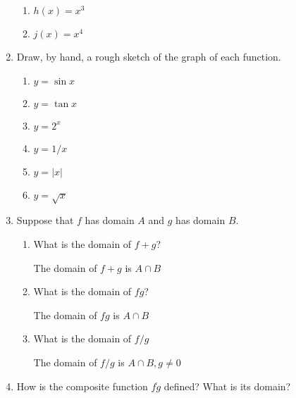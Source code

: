 \documentclass{article}
\begin{document}
\begin{enumerate}
\begin{enumerate}
			\item $h(x) = x^3$

			\item $j(x) = x^4$
		\end{enumerate}

		\item Draw, by hand, a rough sketch of the graph of each function.

		\begin{enumerate}
			\item $y = \sin x$

			\item $y = \tan x$

			\item $y = 2^x$

			\item $y = 1/x$

			\item $y = |x|$

			\item $y = \sqrt{x}$
		\end{enumerate}

		\item Suppose that $f$ has domain $A$ and $g$ has domain $B$.

		\begin{enumerate}
			\item What is the domain of $f + g$?

			The domain of $f + g$ is $A \cap B$


			\item What is the domain of $fg$?

			The domain of $fg$ is $A \cap B$

			\item What is the domain of $f/g$

			The domain of $f/g$ is $A \cap B, g \ne 0$ 
			
		\end{enumerate}

		\item How is the composite function $f \dot g$ defined? What is
			its domain?
	\end{enumerate}
\end{document}

